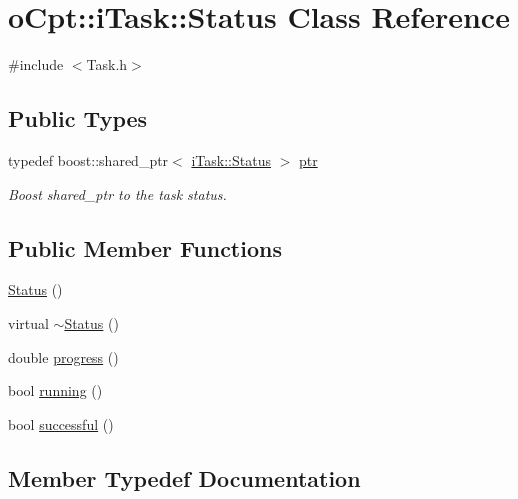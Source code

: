 \hypertarget{classo_cpt_1_1i_task_1_1_status}{}\section{o\+Cpt\+:\+:i\+Task\+:\+:Status Class Reference}
\label{classo_cpt_1_1i_task_1_1_status}


{\ttfamily \#include $<$Task.\+h$>$}

\subsection*{Public Types}
\begin{DoxyCompactItemize}
\item 
typedef boost\+::shared\+\_\+ptr$<$ \hyperlink{classo_cpt_1_1i_task_1_1_status}{i\+Task\+::\+Status} $>$ \hyperlink{classo_cpt_1_1i_task_1_1_status_aaf766c58d038e2defc3de2dddb92d1eb}{ptr}
\begin{DoxyCompactList}\small\item\em Boost shared\+\_\+ptr to the task status. \end{DoxyCompactList}\end{DoxyCompactItemize}
\subsection*{Public Member Functions}
\begin{DoxyCompactItemize}
\item 
\hyperlink{classo_cpt_1_1i_task_1_1_status_a5fab36410db264d0b9815f34227f33d0}{Status} ()
\item 
virtual \hyperlink{classo_cpt_1_1i_task_1_1_status_a80bab1abd55406ce11f5878c2bf5f500}{$\sim$\+Status} ()
\item 
double \hyperlink{classo_cpt_1_1i_task_1_1_status_abc4f40acb0a7b5f73407cefb01187ae8}{progress} ()
\item 
bool \hyperlink{classo_cpt_1_1i_task_1_1_status_aeaab915a0c1d317727087f070d5d64a1}{running} ()
\item 
bool \hyperlink{classo_cpt_1_1i_task_1_1_status_a4140c14ea06f86f87553fa979ccd1836}{successful} ()
\end{DoxyCompactItemize}


\subsection{Member Typedef Documentation}
